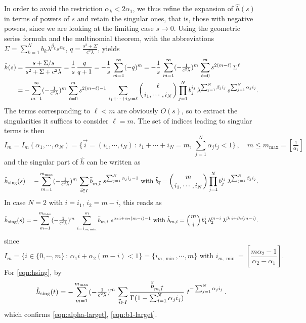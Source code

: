 In order to avoid the restriction $\alpha_k < 2\alpha_1$, we thus refine the expansion of $\hat{h}(s)$ in terms of powers of $s$ and retain the singular ones, that is, those with negative powers, since we are looking at the limiting case $s\to0$.
Using the geometric series formula and the multinomial theorem, with the abbreviations $\Sigma=\sum_{k=1}^N b_k\lambda^{\beta_k} s^{\alpha_k}$, $q=\frac{s^2+\Sigma}{c^2\lambda}$, yields
\[
\begin{aligned}
\hat{h}(s)&=\frac{s+\Sigma/s}{s^2+\Sigma +c^2\lambda} 
= \frac{1}{s}\, \frac{q}{q+1} 
= -\frac{1}{s}\,\sum_{m=1}^\infty (-q)^m
= -\frac{1}{s}\, \sum_{m=1}^\infty (-\tfrac{1}{c^2\lambda})^m\, 
\sum_{\ell=0}^m s^{2(m-\ell)}\, \Sigma^\ell\\
&= -\sum_{m=1}^\infty (-\tfrac{1}{c^2\lambda})^m\, 
\sum_{\ell=0}^m s^{2(m-\ell)-1}\,
\sum_{i_1+\cdots+i_N=\ell}\left({\ell\atop i_1,\cdots,i_N}\right)
\prod_{j=1}^N b_j^{i_j}\, \lambda^{\sum_{j=1}^N\beta_j i_j}
\, s^{\sum_{j=1}^N\alpha_j i_j}.
\end{aligned}
\]
The terms corresponding to $\ell<m$ are obviously $O(s)$, so to extract the singularities it suffices to consider $\ell=m$. The set of indices leading to singular terms is then
\[
I_m=I_m(\alpha_1,\cdots,\alpha_N)=\{\vec{i}=(i_1,\cdots,i_N)\, : \, 
i_1+\cdots+i_N=m, \, \sum_{j=1}^N\alpha_j i_j <1\}\,, \quad
m\leq m_{\max}=[\tfrac{1}{\alpha_1}]
\]
and the singular part of $\hat{h}$ can be written as
\begin{equation}\label{eqn:hsing}
\hat{h}_{\textup{sing}}(s)
= -\sum_{m=1}^{m_{\max}} (-\tfrac{1}{c^2\lambda})^m\, 
\sum_{\vec{i}\in I} \tilde{b}_{m,\vec{i}}
\,\, s^{\sum_{j=1}^N\alpha_j i_j-1}
\mbox{ with } 
\tilde{b}_{\vec{i}} = \left({m\atop i_1,\cdots,i_N}\right)
\prod_{j=1}^N b_j^{i_j}\, \lambda^{\sum_{j=1}^N\beta_j i_j}.
\end{equation}
In case $N=2$ with $i=i_1$, $i_2=m-i$, this reads as
\[
\hat{h}_{\textup{sing}}(s)
= -\sum_{m=1}^{m_{\max}} (-\tfrac{1}{c^2\lambda})^m\, 
\sum_{i=i_{m,\min}}^m \tilde{b}_{m,i}
\,\, s^{\alpha_1 i + \alpha_2(m-i)-1}
\mbox{ with }
\tilde{b}_{m,i} = \left({m\atop i}\right)
b_1^i\, b_2^{m-i}\, \lambda^{\beta_1 i +\beta_2(m-i)}.
\]
since
\[
I_m=\{i\in\{0,\cdots,m\}\, : \, \alpha_1 i +\alpha_2(m-i) <1\}
=\{i_{m,\min},\cdots,m\} \mbox{ with } i_{m,\min}=\left[\frac{m\alpha_2 -1}{\alpha_2-\alpha_1}\right].
\] 
For \eqref{eqn:hsing}, by 
\[
\hat{h}_{\textup{sing}}(t)
= -\sum_{m=1}^{m_{\max}} (-\tfrac{1}{c^2\lambda})^m\, 
\sum_{\vec{i}\in I} \frac{\tilde{b}_{m,\vec{i}}}{\Gamma(1-\sum_{j=1}^N\alpha_j i_j)}
\,\, t^{-\sum_{j=1}^N\alpha_j i_j}\,.
\]
which confirms \eqref{eqn:alpha-larget}, \eqref{eqn:b1-larget}.

